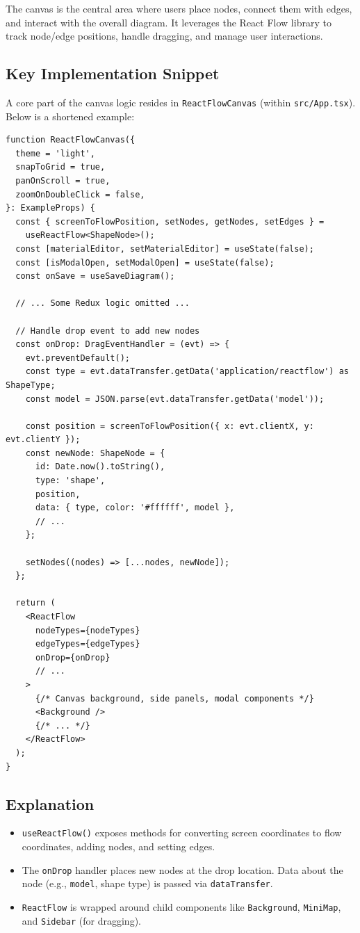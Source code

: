 \documentclass{article}
\begin{document}
The canvas is the central area where users place nodes, connect them with edges, and interact with the overall diagram. It leverages the React Flow library to track node/edge positions, handle dragging, and manage user interactions.

\subsection{Key Implementation Snippet}
A core part of the canvas logic resides in \texttt{ReactFlowCanvas} (within \texttt{src/App.tsx}). Below is a shortened example:

\begin{verbatim}
function ReactFlowCanvas({
  theme = 'light',
  snapToGrid = true,
  panOnScroll = true,
  zoomOnDoubleClick = false,
}: ExampleProps) {
  const { screenToFlowPosition, setNodes, getNodes, setEdges } =
    useReactFlow<ShapeNode>();
  const [materialEditor, setMaterialEditor] = useState(false);
  const [isModalOpen, setModalOpen] = useState(false);
  const onSave = useSaveDiagram();

  // ... Some Redux logic omitted ...

  // Handle drop event to add new nodes
  const onDrop: DragEventHandler = (evt) => {
    evt.preventDefault();
    const type = evt.dataTransfer.getData('application/reactflow') as ShapeType;
    const model = JSON.parse(evt.dataTransfer.getData('model'));

    const position = screenToFlowPosition({ x: evt.clientX, y: evt.clientY });
    const newNode: ShapeNode = {
      id: Date.now().toString(),
      type: 'shape',
      position,
      data: { type, color: '#ffffff', model },
      // ...
    };

    setNodes((nodes) => [...nodes, newNode]);
  };

  return (
    <ReactFlow
      nodeTypes={nodeTypes}
      edgeTypes={edgeTypes}
      onDrop={onDrop}
      // ...
    >
      {/* Canvas background, side panels, modal components */}
      <Background />
      {/* ... */}
    </ReactFlow>
  );
}
\end{verbatim}

\subsection{Explanation}
\begin{itemize}
  \item \texttt{useReactFlow()} exposes methods for converting screen coordinates to flow coordinates, adding nodes, and setting edges.
  \item The \texttt{onDrop} handler places new nodes at the drop location. Data about the node (e.g., \texttt{model}, shape type) is passed via \texttt{dataTransfer}.
  \item \texttt{ReactFlow} is wrapped around child components like \texttt{Background}, \texttt{MiniMap}, and \texttt{Sidebar} (for dragging).
\end{itemize}
\end{document}
